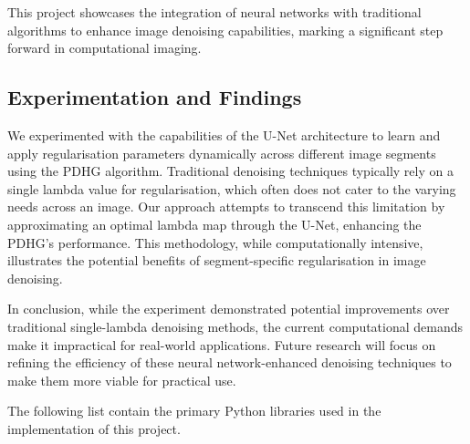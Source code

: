 \documentclass[12pt]{article}
\begin{document}
This project showcases the integration of neural networks with traditional algorithms to enhance image denoising capabilities, marking a significant step forward in computational imaging.

\subsection{Experimentation and Findings}

We experimented with the capabilities of the U-Net architecture to learn and apply regularisation parameters dynamically across different image segments using the PDHG algorithm. Traditional denoising techniques typically rely on a single lambda value for regularisation, which often does not cater to the varying needs across an image. Our approach attempts to transcend this limitation by approximating an optimal lambda map through the U-Net, enhancing the PDHG's performance. This methodology, while computationally intensive, illustrates the potential benefits of segment-specific regularisation in image denoising.



In conclusion, while the experiment demonstrated potential improvements over traditional single-lambda denoising methods, the current computational demands make it impractical for real-world applications. Future research will focus on refining the efficiency of these neural network-enhanced denoising techniques to make them more viable for practical use.


\newpage




\printbibliography


The following list contain the primary Python libraries used in the implementation of this project.

\vspace{-6pt}
\end{document}
